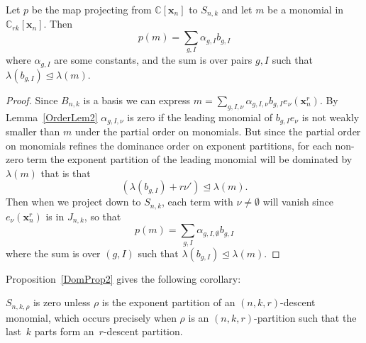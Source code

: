 \documentclass[ALCO,ThmDefs,Unicode,epreuves]{cedram}
\begin{document}
\begin{prop}
\label{DomProp2}
	Let $p$ be the map projecting from $\mathbb{C}[\mathbf{x}_n]$ to $S_{n,k}$ and let $m$ be a monomial in 
$\mathbb{C}_{rk}[\mathbf{x}_n]$. Then
\begin{equation}
p(m)=\sum_{g,I} \alpha_{g,I} b_{g,I}
\end{equation}
where 
$\alpha_{g,I}$ are some constants, and the sum is over pairs $g,I$ such that $\lambda(b_{g,I})\trianglelefteq \lambda(m)$.

	\begin{proof}
		Since $B_{n,k}$ is a basis we can express $m=\sum_{g,I,\nu} \alpha_{g,I,\nu} b_{g,I} e_\nu(\mathbf{x}_n^r)$. By Lemma~\ref{OrderLem2} $\alpha_{g,I,\nu}$ is zero if the leading monomial of $b_{g,I}e_\nu$ is not weakly smaller than $m$ 
under the partial order on monomials. But since the partial order on monomials refines the dominance order on exponent 
partitions, for each non-zero term the exponent partition of the leading monomial will be dominated by $\lambda(m)$ 
that is that
\begin{equation}
(\lambda(b_{g,I})+r\nu')\trianglelefteq \lambda(m).
\end{equation}
 Then when we project down 
to $S_{n,k}$, each term with $\nu\neq \emptyset$ will vanish since $e_\nu(\mathbf{x}_n^r)$ is in $J_{n,k}$, so 
that
\begin{equation}
p(m)=\sum_{g,I}\alpha_{g,I,\emptyset} b_{g,I}
\end{equation}
where the sum is over $(g,I)$ such that 
$\lambda(b_{g,I})\trianglelefteq \lambda(m)$.
	\end{proof}

\end{prop}

Proposition~\ref{DomProp2} gives the following corollary:


\begin{coro}
\label{zero2}

	$S_{n,k,\rho}$ is zero unless $\rho$ is the exponent partition of an $(n,k,r)$-descent monomial, which occurs precisely 
when $\rho$ is an $(n,k,r)$-partition such that the last~$k$ parts form an~$r$-descent partition.

\end{coro}
\end{document}

